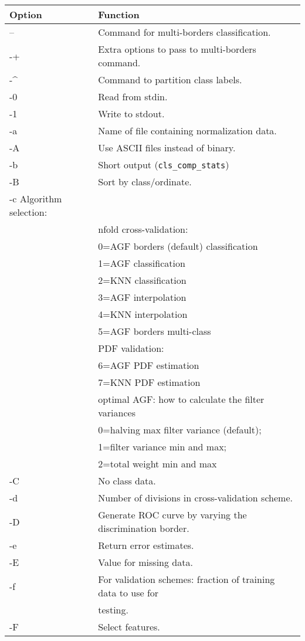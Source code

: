 \documentclass[12pt]{article}
\begin{document}
\begin{table}
	\begin{tabular}{ll}
Option & Function \\
\hline
-- & Command for multi-borders classification.\\
-+ & Extra options to pass to multi-borders command.\\
-\^ & Command to partition class labels.\\
-0 & Read from stdin.\\
-1 & Write to stdout.\\
-a & Name of file containing normalization data.\\
-A & Use ASCII files instead of binary.\\
-b & Short output (\verb/cls_comp_stats/)\\
-B & Sort by class/ordinate.\\
-c		Algorithm selection:\\
& nfold cross-validation:\\
&			0=AGF borders (default) classification\\
&			1=AGF classification\\
&			2=KNN classification\\
&			3=AGF interpolation\\
&			4=KNN interpolation\\
&			5=AGF borders multi-class\\
&		  PDF validation:\\
&			6=AGF PDF estimation\\
&			7=KNN PDF estimation\\
&		  optimal AGF: how to calculate the filter variances\\
&			0=halving max filter variance (default);\\
&			1=filter variance min and max;\\
&			2=total weight min and max\\
-C & No class data.\\
-d & Number of divisions in cross-validation scheme.\\
-D&		Generate ROC curve by varying the discrimination border.\\
-e&		Return error estimates.\\
-E&		Value for missing data.\\
-f&		For validation schemes:  fraction of training data to use for \\
  &		  testing.\\
-F&		Select features.\\

\end{tabular}
\end{table}
\end{document}
